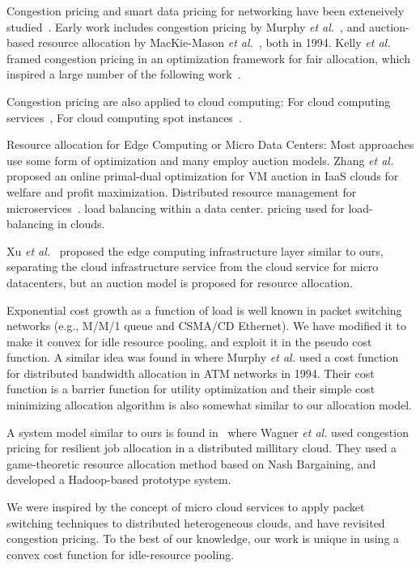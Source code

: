 Congestion pricing and smart data pricing for networking have been
exteneively studied~\cite{Sen-2013}.
Early work includes congestion pricing by
Murphy {\em et al.}~\cite{Murphy94distributedpricing},
and auction-based resource allocation by
MacKie-Mason {\em et al.}~\cite{pricing-internet-1994}, both in 1994.
Kelly {\em et al.}~\cite{Kelly-1998} framed congestion pricing in an
optimization framework for fair allocation, which inspired a large
number of the following
work~\cite{gibbens1999resource,Henderson2001,Briscoe2003-M3I}.

Congestion pricing are also applied to cloud computing:
For cloud computing services~\cite{Wang-hotcloud2010,Kilcioglu-SIGMETRICS2015},
For cloud computing spot instances~\cite{Song-INFOCOM2017}.

Resource allocation for Edge Computing or Micro Data Centers:
Most approaches use some form of optimization and many employ auction
models.
Zhang {\em et al.}~\cite{Xu2017-zenith,Zhang2017-VMauction}
proposed an online primal-dual optimization for VM auction in IaaS
clouds for welfare and profit maximization.
Distributed resource management for microservices~\cite{Suresh-SOA-SOCC2017}.
load balancing within a data center\cite{Rikhtegar2021BiTEAD,Chen-SOCC-2014}.
pricing used for load-balancing in clouds\cite{Song-2014,Ren-2017}.

Xu {\em et al.}~\cite{Xu2017-zenith} proposed the edge computing
infrastructure layer similar to ours, separating the cloud
infrastructure service from the cloud service for micro datacenters,
but an auction model is proposed for resource allocation.

Exponential cost growth as a function of load is well known in packet
switching networks (e.g., M/M/1 queue and CSMA/CD Ethernet).
We have modified it to make it convex for idle resource pooling, and
exploit it in the pseudo cost function.
A similar idea was found in \cite{Murphy94distributedpricing} where
Murphy {\em et al.} used a cost function for distributed bandwidth
allocation in ATM networks in 1994.
Their cost function is a barrier function for utility optimization
and their simple cost minimizing allocation algorithm is also somewhat
similar to our allocation model.

A system model similar to ours is found in~\cite{Wagner-2012} where
Wagner {\em et al.} used congestion pricing for resilient job
allocation in a distributed millitary cloud.  They used a
game-theoretic resource allocation method based on Nash Bargaining,
and developed a Hadoop-based prototype system.

We were inspired by the concept of micro cloud services to apply packet
switching techniques to distributed heterogeneous clouds, and have
revisited congestion pricing.
To the best of our knowledge, our work is unique in using a convex
cost function for idle-resource pooling.



